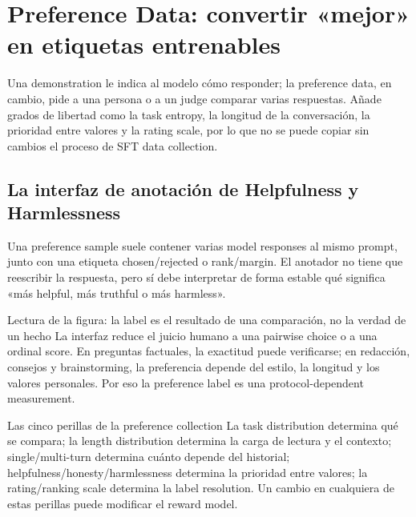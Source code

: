 \section{Preference Data: convertir «mejor» en etiquetas entrenables}

Una demonstration le indica al modelo cómo responder; la preference data, en cambio, pide a una persona o a un judge comparar varias respuestas. Añade grados de libertad como la task entropy, la longitud de la conversación, la prioridad entre valores y la rating scale, por lo que no se puede copiar sin cambios el proceso de SFT data collection.

\subsection{La interfaz de anotación de Helpfulness y Harmlessness}

Una preference sample suele contener varias model responses al mismo prompt, junto con una etiqueta chosen/rejected o rank/margin. El anotador no tiene que reescribir la respuesta, pero sí debe interpretar de forma estable qué significa «más helpful, más truthful o más harmless».


\begin{knowledgebox}{Lectura de la figura: la label es el resultado de una comparación, no la verdad de un hecho}
La interfaz reduce el juicio humano a una pairwise choice o a una ordinal score. En preguntas factuales, la exactitud puede verificarse; en redacción, consejos y brainstorming, la preferencia depende del estilo, la longitud y los valores personales. Por eso la preference label es una protocol-dependent measurement.
\end{knowledgebox}


\begin{importantbox}{Las cinco perillas de la preference collection}
La task distribution determina qué se compara; la length distribution determina la carga de lectura y el contexto; single/multi-turn determina cuánto depende del historial; helpfulness/honesty/harmlessness determina la prioridad entre valores; la rating/ranking scale determina la label resolution. Un cambio en cualquiera de estas perillas puede modificar el reward model.
\end{importantbox}

